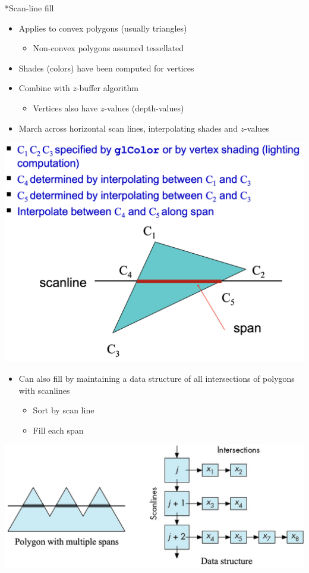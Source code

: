 \documentclass[a4paper]{article}
\makeatletter
\renewcommand{\subsection}{
  \@startsection{subsection}{2}{0pt}{1ex}{1.2ex} {\raggedleft\normalfont\normalsize\bfseries\fbox}}
\makeatother
\begin{document}
\begin{multicols*}{3}
  \subsection*{Scan-line fill}
    \begin{itemize}[leftmargin=*]
      \item Applies to convex polygons (usually triangles)
        \begin{itemize}[leftmargin=*]
          \item Non-convex polygons assumed tessellated
        \end{itemize}
      \item Shades (colors) have been computed for vertices
      \item Combine with $z$-buffer algorithm
        \begin{itemize}[leftmargin=*]
          \item Vertices also have $z$-values (depth-values)
        \end{itemize}
      \item March across horizontal scan lines, interpolating shades and $z$-values
    \end{itemize}
    \includegraphics[width=\columnwidth]{L6/scan-line}
    \begin{itemize}[leftmargin=*]
      \item Can also fill by maintaining a data structure of all intersections of polygons with scanlines
        \begin{itemize}[leftmargin=*]
          \item Sort by scan line
          \item Fill each span
        \end{itemize}
    \end{itemize}
    \includegraphics[width=\columnwidth]{L6/scan-line-ds}

\end{multicols*}
\end{document}
